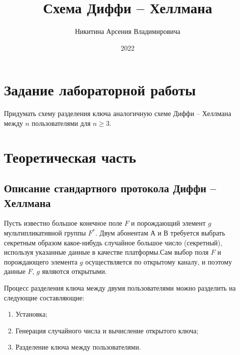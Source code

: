 \documentclass[bachelor, och, labwork]{shiza}
\begin{document}
\title{Схема Диффи -- Хеллмана}





\author{Никитина Арсения Владимировича}




\date{2022}

\maketitle



\tableofcontents





\section{Задание лабораторной работы}
Придумать схему разделения ключа аналогичную схеме Диффи -- Хеллмана между $n$
пользователями для $n \geqslant 3$.



\section{Теоретическая часть}

\subsection{Описание стандартного протокола Диффи -- Хеллмана}

Пусть известно большое конечное поле $F$ и порождающий элемент $g$ мультипликативной 
группы $F^*$. Двум абонентам А и В требуется выбрать секретным образом какое-нибудь
слу­чайное большое число  (секретный),  используя указанные данные в  качестве 
платформы.Сам выбор поля $F$ и порождающего элемента $g$ осуществляется по открытому
каналу, и поэтому данные $F$, $g$ являются открытыми.

Процесс разделения ключа между двумя пользователями можно разделить на следующие
составляющие:


\begin{enumerate}
    \item Установка;
    \item Генерация случайного числа и вычисление открытого ключа;
    \item Разделение ключа между пользователями.
\end{enumerate}
\end{document}
